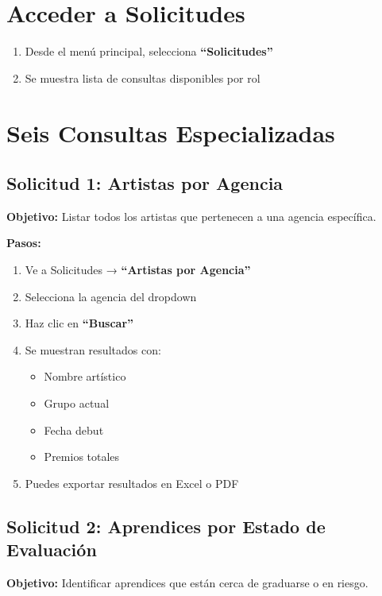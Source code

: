\documentclass[12pt,a4paper,spanish,oneside]{report}
\begin{document}
\section{Acceder a Solicitudes}

\begin{enumerate}
\item Desde el menú principal, selecciona \textbf{``Solicitudes''}
\item Se muestra lista de consultas disponibles por rol
\end{enumerate}

\section{Seis Consultas Especializadas}

\subsection{Solicitud 1: Artistas por Agencia}

\textbf{Objetivo:} Listar todos los artistas que pertenecen a una agencia específica.

\textbf{Pasos:}
\begin{enumerate}
\item Ve a Solicitudes → \textbf{``Artistas por Agencia''}
\item Selecciona la agencia del dropdown
\item Haz clic en \textbf{``Buscar''}
\item Se muestran resultados con:
\begin{itemize}
\item Nombre artístico
\item Grupo actual
\item Fecha debut
\item Premios totales
\end{itemize}
\item Puedes exportar resultados en Excel o PDF
\end{enumerate}

\subsection{Solicitud 2: Aprendices por Estado de Evaluación}

\textbf{Objetivo:} Identificar aprendices que están cerca de graduarse o en riesgo.
\end{document}
